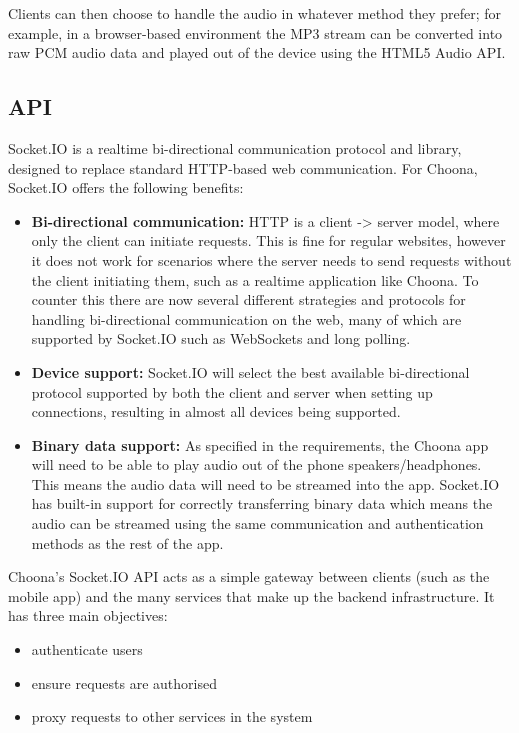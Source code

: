 Clients can then choose to handle the audio in whatever method they prefer; for example, in a browser-based environment the MP3 stream can be converted into raw PCM audio data and played out of the device using the HTML5 Audio API.


\subsection{API}

Socket.IO is a realtime bi-directional communication protocol and library, designed to replace standard HTTP-based web communication. For Choona, Socket.IO offers the following benefits:

\begin{itemize}
  \item \textbf{Bi-directional communication:} HTTP is a client -> server model, where only the client can initiate requests. This is fine for regular websites, however it does not work for scenarios where the server needs to send requests without the client initiating them, such as a realtime application like Choona. To counter this there are now several different strategies and protocols for handling bi-directional communication on the web, many of which are supported by Socket.IO such as WebSockets and long polling.
  \item \textbf{Device support:} Socket.IO will select the best available bi-directional protocol supported by both the client and server when setting up connections, resulting in almost all devices being supported.
  \item \textbf{Binary data support:} As specified in the requirements, the Choona app will need to be able to play audio out of the phone speakers/headphones. This means the audio data will need to be streamed into the app. Socket.IO has built-in support for correctly transferring binary data which means the audio can be streamed using the same communication and authentication methods as the rest of the app.
\end{itemize}

Choona's Socket.IO API acts as a simple gateway between clients (such as the mobile app) and the many services that make up the backend infrastructure. It has three main objectives:

\begin{itemize}
  \item authenticate users
  \item ensure requests are authorised
  \item proxy requests to other services in the system
\end{itemize}

